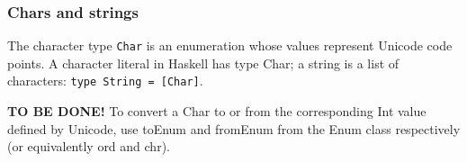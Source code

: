 %

\subsubsection{Chars and strings}
The character type \texttt{Char} is an enumeration whose values represent Unicode code points.
A character literal in Haskell has type Char; a string is a list of characters: \texttt{type String = [Char]}.

\textbf{TO BE DONE!}
To convert a Char to or from the corresponding Int value defined by Unicode, use toEnum and fromEnum from the Enum class respectively (or equivalently ord and chr).

%